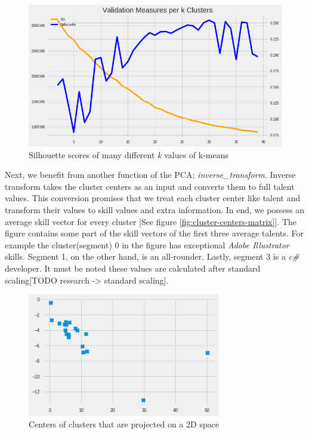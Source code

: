  \begin{figure}[!ht]
	\centering
	\includegraphics[width=\textwidth]{figures/PCASilhouette.png}
	\caption{Silhouette scores of many different \textit{k} values of k-means}
	\label{fig:pca-silhouette}
\end{figure}


Next, we benefit from another function of the PCA; \textit{inverse\_transform}. Inverse transform takes the cluster centers as an input and converts them to full talent values. This conversion promises that we treat each cluster center like talent and transform their values to skill values and extra information. In end, we possess an average skill vector for every cluster [See figure \ref{fig:cluster-centers-matrix}]. The figure contains some part of the skill vectors of the first three average talents. For example the cluster(segment) 0 in the figure has exceptional \textit{Adobe Illustrator} skills. Segment 1, on the other hand, is an all-rounder. Lastly, segment 3 is a \textit{c\#} developer.  It must be noted these values are calculated after standard scaling[TODO research -> standard scaling].

 \begin{figure}[!ht]
	\centering
	\includegraphics[width=0.75\textwidth]{figures/KMeansCenters.png}
	\caption{Centers of clusters that are projected on a 2D space}
	\label{fig:kmeans-centers}
\end{figure}


